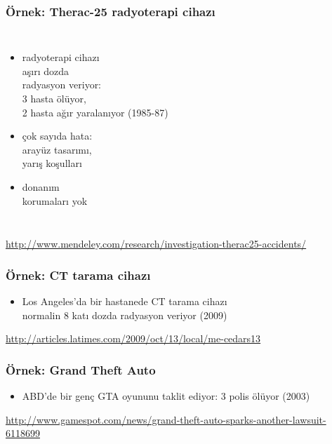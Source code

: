 \documentclass[dvipsnames]{beamer}
\theoremstyle{definition}
\theoremstyle{example}
\theoremstyle{plain}
\begin{document}
\begin{frame}
  \frametitle{Örnek: Therac-25 radyoterapi cihazı}

  \begin{columns}

    \begin{itemize}
      \item radyoterapi cihazı\\
        aşırı dozda\\
        radyasyon veriyor:\\
        3 hasta ölüyor,\\
        2 hasta ağır yaralanıyor (1985-87)

      \item çok sayıda hata:\\
        arayüz tasarımı,\\
        yarış koşulları
      \item donanım\\
        korumaları yok
    \end{itemize}
  \end{columns}

  \medskip
  \tiny{\url{http://www.mendeley.com/research/investigation-therac25-accidents/}}\\
\end{frame}

\begin{frame}
  \frametitle{Örnek: CT tarama cihazı}

  \begin{center}
  \end{center}

  \begin{itemize}
    \item Los Angeles'da bir hastanede CT tarama cihazı\\
      normalin 8 katı dozda radyasyon veriyor (2009)
  \end{itemize}

  \medskip
  \tiny{\url{http://articles.latimes.com/2009/oct/13/local/me-cedars13}}\\
\end{frame}

\begin{frame}
  \frametitle{Örnek: Grand Theft Auto}

  \begin{center}
  \end{center}

  \begin{itemize}
    \item ABD'de bir genç GTA oyununu taklit ediyor: 3 polis ölüyor (2003)
  \end{itemize}

  \medskip
  \tiny{\url{http://www.gamespot.com/news/grand-theft-auto-sparks-another-lawsuit-6118699}}\\
\end{frame}
\end{document}
